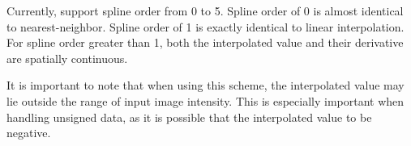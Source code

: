 Currently,  support spline order
from 0 to 5. Spline order of 0 is almost identical to nearest-neighbor.
Spline order of 1 is exactly identical to linear interpolation. For 
spline order greater than 1, both the interpolated value and their
derivative are spatially continuous.

It is important to note that when using this scheme, the interpolated
value may lie outside the range of input image intensity. This is
especially important when handling unsigned data, as it is possible
that the interpolated value to be negative.


